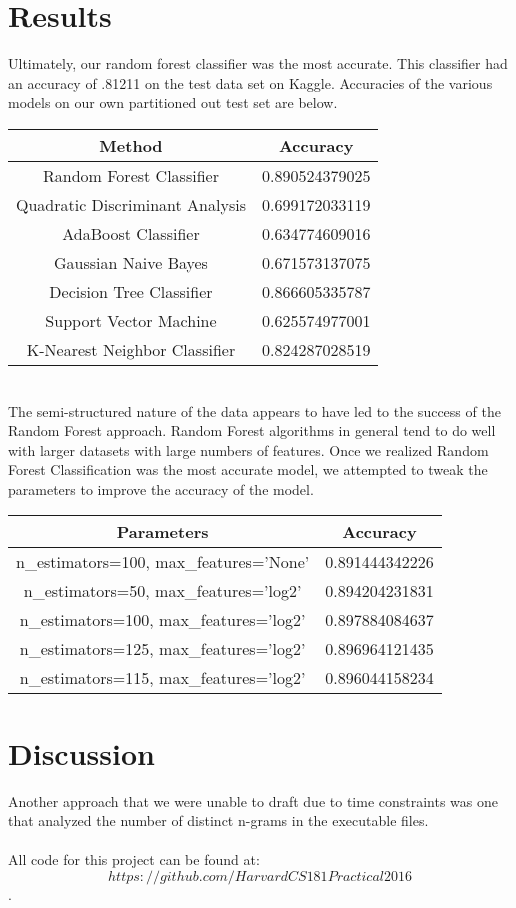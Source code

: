 \documentclass{article}
\begin{document}
\section{Results}
Ultimately, our random forest classifier was the most accurate.  This classifier had an accuracy of .81211 on the test data set on Kaggle. Accuracies of the various models on our own partitioned out test set are below. 
\begin{table}[ht]
\centering 
\begin{tabular}{c c } 
\hline 
Method & Accuracy\\ [0.5ex] 
\hline 
Random Forest Classifier & 0.890524379025 \\ 
Quadratic Discriminant Analysis & 0.699172033119\\
AdaBoost Classifier & 0.634774609016\\
Gaussian Naive Bayes & 0.671573137075\\
Decision Tree Classifier & 0.866605335787\\
Support Vector Machine & 0.625574977001\\
K-Nearest Neighbor Classifier & 0.824287028519\\ [1ex] 
\hline 
\end{tabular}
\label{table:nonlin} 
\end{table}\\
The semi-structured nature of the data appears to have led to the success of the Random Forest approach. Random Forest algorithms in general tend to do well with larger datasets with large numbers of features. Once we realized Random Forest Classification was the most accurate model, we attempted to tweak the parameters to improve the accuracy of the model. 
\begin{table}[ht]
\centering 
\begin{tabular}{c c } 
\hline 
Parameters & Accuracy\\ [0.5ex] 
\hline 
n\_estimators=100, max\_features='None' & 0.891444342226\\ 
n\_estimators=50, max\_features='log2' & 0.894204231831\\
n\_estimators=100, max\_features='log2' & 0.897884084637\\
n\_estimators=125, max\_features='log2' & 0.896964121435\\
n\_estimators=115, max\_features='log2' & 0.896044158234\\ [1ex] 
\hline 
\end{tabular}
\label{table:nonlin} 
\end{table}

\section{Discussion}
Another approach that we were unable to draft due to time constraints was one that analyzed the number of distinct n-grams in the executable files.\\\\
All code for this project can be found at: $$https://github.com/HarvardCS181Practical2016$$.
\end{document}
